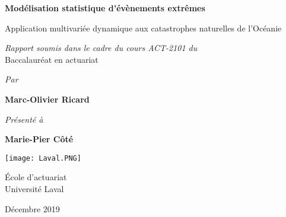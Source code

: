 
\begin{titlepage}
    \begin{center}
        \vspace*{1cm}
        
        \Large
        \textbf{Modélisation statistique d'évènements extrêmes}
        
        \large
        \vspace{0.4cm}
        
        Application multivariée dynamique aux catastrophes naturelles de l'Océanie
 
        \vspace{3cm}
 
        \textit{Rapport soumis dans le cadre du cours ACT-2101 du} \\
        Baccalauréat en actuariat
 
        \vspace{1cm}
        
        \textit{Par}
 
        \textbf{Marc-Olivier Ricard}
        
        \vspace{1cm}
        
        \textit{Présenté à}
 
        \textbf{Marie-Pier Côté}
 
        \vfill
 
        \texttt{[image: Laval.PNG]}
        
        \vspace{1.5cm}
 
        École d'actuariat\\
        Université Laval\\
        
        \vspace{0.5cm}
        
        Décembre 2019
 
    \end{center}
\end{titlepage}
